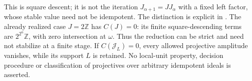 This is square descent; it is not the iteration
$J_{\alpha+1}=J J_\alpha$ with a fixed left factor, whose stable
value need not be idempotent. The distinction is explicit in
\cite[Lemmas~1.1 and~1.3]{Emmanouil}. The already realized case
$J=2\mathbb Z$ has $C(J)=0$: its finite square-descending terms are
$2^{2^n}\mathbb Z$, with zero intersection at $\omega$. Thus the
reduction can be strict and need not stabilize at a finite stage.
If $C(\mathcal J_L)=0$, every allowed projective amplitude vanishes,
while its support $L$ is retained. No local-unit property, decision
procedure or classification of projectives over arbitrary idempotent
ideals is asserted.
